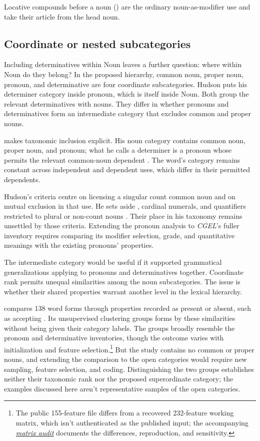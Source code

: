 \documentclass[12pt]{article}
\begin{document}
Locative compounds before a noun () are the ordinary noun-as-modifier use and take their article from the head noun.

\subsection{Coordinate or nested subcategories}\label{sec:inheritance}

Including determinatives within Noun leaves a further question: where within Noun do they belong? In the proposed hierarchy, common noun, proper noun, pronoun, and determinative are four coordinate subcategories. Hudson puts his determiner category inside pronoun, which is itself inside Noun. Both group the relevant determinatives with nouns. They differ in whether pronouns and determinatives form an intermediate category that excludes common and proper nouns.

\textcite[253--254]{hudson2010wordgrammar} makes taxonomic inclusion explicit. His noun category contains common noun, proper noun, and pronoun; what he calls a determiner is a pronoun whose  permits the relevant common-noun dependent \citep[9--10]{hudson2004determiners}. The word's category remains constant across independent and dependent uses, which differ in their permitted dependents.

Hudson's criteria centre on licensing a singular count common noun and on mutual exclusion in that use. He sets aside , cardinal numerals, and quantifiers restricted to plural or non-count nouns \citep[9--10]{hudson2004determiners}. Their place in his taxonomy remains unsettled by those criteria. Extending the pronoun analysis to \textit{CGEL}'s fuller inventory requires comparing its modifier selection, grade, and quantitative meanings with the existing pronouns' properties.

The intermediate category would be useful if it supported grammatical generalizations applying to pronouns and determinatives together. Coordinate rank permits unequal similarities among the noun subcategories. The issue is whether their shared properties warrant another level in the lexical hierarchy.

\textcite{reynolds2021} compares 138 word forms through properties recorded as present or absent, such as accepting . Its unsupervised clustering groups forms by these similarities without being given their category labels. The groups broadly resemble the pronoun and determinative inventories, though the outcome varies with initialization and feature selection.\footnote{The public 155-feature file differs from a recovered 232-feature working matrix, which isn't authenticated as the published input; the accompanying \href{run:matrix-audit.pdf}{\textit{matrix audit}} documents the differences, reproduction, and sensitivity.} But the study contains no common or proper nouns, and extending the comparison to the open categories would require new sampling, feature selection, and coding. Distinguishing the two groups establishes neither their taxonomic rank nor the proposed superordinate category; the examples discussed here aren't representative samples of the open categories.
\end{document}
